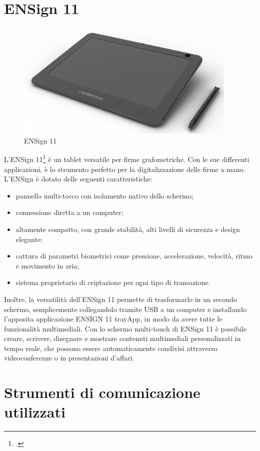 \section{ENSign 11}

\begin{figure}[!h] 
    \centering 
    \includegraphics[width=300pt]{images/ensign11.png} 
    \caption{ENSign 11}
    \label{fig:ens11}
\end{figure}

L'ENSign 11\footcite{site:ensign11} è un tablet versatile per firme grafometriche. Con le sue differenti applicazioni, è lo strumento perfetto per la digitalizzazione delle firme a mano.\\
L'ENSign è dotato delle seguenti caratteristiche:
\begin{itemize}
    \item pannello multi-tocco con isolamento nativo dello schermo;
    \item connessione diretta a un computer;
    \item altamente compatto, con grande stabilità, alti livelli di sicurezza e design elegante;
    \item cattura di parametri biometrici come pressione, accelerazione, velocità, ritmo e movimento in aria;
    \item sistema proprietario di criptazione per ogni tipo di transazione.
\end{itemize}
Inoltre, la versatilità dell'ENSign 11 permette di trasformarlo in un secondo schermo, semplicemente collegandolo tramite USB a un computer e installando l'apposita applicazione ENSIGN 11 trayApp, in modo da avere tutte le funzionalità multimediali.
Con lo schermo multi-touch di ENSign 11 è possibile creare, scrivere, disegnare e mostrare contenuti multimediali personalizzati in tempo reale, che possono essere automaticamente condivisi attraverso videoconferenze o in presentazioni d'affari.

\section{Strumenti di comunicazione utilizzati}

